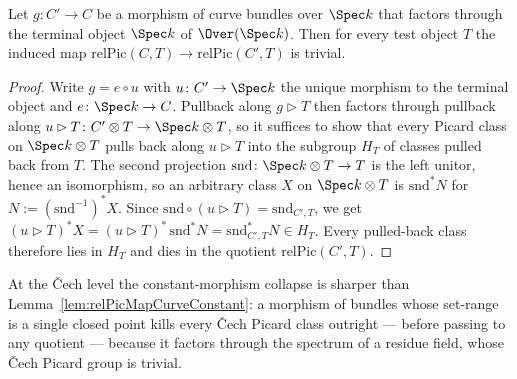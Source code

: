 \begin{lemma}
  \label{lem:relPicMapCurveConstant}
  \leanok
  Let \(g \colon C' \to C\) be a morphism of curve bundles over \(\Spec k\) that factors
  through the terminal object \(\Spec k\) of \(\Over(\Spec k)\). Then for every test
  object \(T\) the induced map \(\mathrm{relPic}(C,T) \to \mathrm{relPic}(C',T)\) is
  trivial.
\end{lemma}
\begin{proof}
  \leanok
  Write \(g = e \circ u\) with \(u \colon C' \to \Spec k\) the unique morphism to the
  terminal object and \(e \colon \Spec k \to C\). Pullback along \(g \rhd T\) then factors
  through pullback along \(u \rhd T \colon C' \otimes T \to \Spec k \otimes T\), so it
  suffices to show that every Picard class on \(\Spec k \otimes T\) pulls back along
  \(u \rhd T\) into the subgroup \(H_T\) of classes pulled back from \(T\). The second
  projection \(\mathrm{snd} \colon \Spec k \otimes T \to T\) is the left unitor, hence an
  isomorphism, so an arbitrary class \(X\) on \(\Spec k \otimes T\) is
  \(\mathrm{snd}^{*} N\) for \(N := (\mathrm{snd}^{-1})^{*} X\). Since
  \(\mathrm{snd} \circ (u \rhd T) = \mathrm{snd}_{C',T}\), we get
  \((u \rhd T)^{*} X = (u \rhd T)^{*}\,\mathrm{snd}^{*} N = \mathrm{snd}_{C',T}^{*} N \in
  H_T\). Every pulled-back class therefore lies in \(H_T\) and dies in the quotient
  \(\mathrm{relPic}(C',T)\).
\end{proof}

At the \v Cech level the constant-morphism collapse is sharper than
Lemma~\ref{lem:relPicMapCurveConstant}: a morphism of bundles whose set-range is a
single closed point kills every \v Cech Picard class outright --- before passing to any
quotient --- because it factors through the spectrum of a residue field, whose \v Cech
Picard group is trivial.

